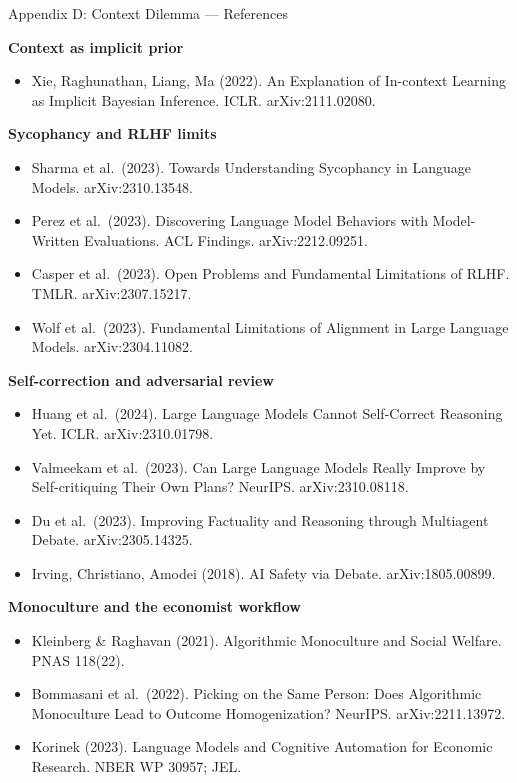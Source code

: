 \documentclass[10pt,english,aspectratio=169]{beamer}
\begin{document}
\begin{frame}{Appendix D: Context Dilemma --- References}
\scriptsize

\textbf{Context as implicit prior}
\begin{itemize}
    \item Xie, Raghunathan, Liang, Ma (2022). An Explanation of In-context Learning as Implicit Bayesian Inference. ICLR. arXiv:2111.02080.
\end{itemize}

\textbf{Sycophancy and RLHF limits}
\begin{itemize}
    \item Sharma et al.\ (2023). Towards Understanding Sycophancy in Language Models. arXiv:2310.13548.
    \item Perez et al.\ (2023). Discovering Language Model Behaviors with Model-Written Evaluations. ACL Findings. arXiv:2212.09251.
    \item Casper et al.\ (2023). Open Problems and Fundamental Limitations of RLHF. TMLR. arXiv:2307.15217.
    \item Wolf et al.\ (2023). Fundamental Limitations of Alignment in Large Language Models. arXiv:2304.11082.
\end{itemize}

\textbf{Self-correction and adversarial review}
\begin{itemize}
    \item Huang et al.\ (2024). Large Language Models Cannot Self-Correct Reasoning Yet. ICLR. arXiv:2310.01798.
    \item Valmeekam et al.\ (2023). Can Large Language Models Really Improve by Self-critiquing Their Own Plans? NeurIPS. arXiv:2310.08118.
    \item Du et al.\ (2023). Improving Factuality and Reasoning through Multiagent Debate. arXiv:2305.14325.
    \item Irving, Christiano, Amodei (2018). AI Safety via Debate. arXiv:1805.00899.
\end{itemize}

\textbf{Monoculture and the economist workflow}
\begin{itemize}
    \item Kleinberg \& Raghavan (2021). Algorithmic Monoculture and Social Welfare. PNAS 118(22).
    \item Bommasani et al.\ (2022). Picking on the Same Person: Does Algorithmic Monoculture Lead to Outcome Homogenization? NeurIPS. arXiv:2211.13972.
    \item Korinek (2023). Language Models and Cognitive Automation for Economic Research. NBER WP 30957; JEL.
\end{itemize}
\end{frame}
\end{document}
